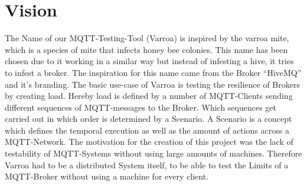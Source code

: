 \chapter{Vision}
The Name of our MQTT-Testing-Tool (Varroa) is inspired by the varroa mite, which is a species of mite that infects honey bee colonies.
This name has been chosen due to it working in a similar way but instead of infesting a hive, it tries to infest a broker.
The inspiration for this name came from the Broker \enquote{HiveMQ} and it's branding.
The basic use-case of Varroa is testing the resilience of Brokers by creating load.
Hereby load is defined by a number of MQTT-Clients sending different sequences of MQTT-messages to the Broker. 
Which sequences get carried out in which order is determined by a Scenario.
A Scenario is a concept which defines the temporal execution as well as the amount of actions across a MQTT-Network.
The motivation for the creation of this project was the lack of testability of MQTT-Systems without using large amounts of machines.
Therefore Varroa had to be a distributed System itself, to be able to test the Limits of a MQTT-Broker without using a machine for every client.

